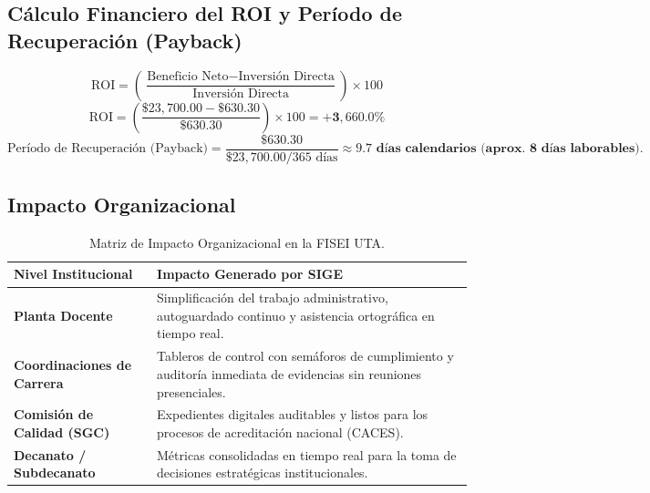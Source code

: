 \documentclass[12pt,a4paper]{article}
\begin{document}
\subsection{Cálculo Financiero del ROI y Período de Recuperación (Payback)}
\[
\text{ROI} = \left( \frac{\text{Beneficio Neto} - \text{Inversión Directa}}{\text{Inversión Directa}} \right) \times 100
\]
\[
\text{ROI} = \left( \frac{\$23,700.00 - \$630.30}{\$630.30} \right) \times 100 = \mathbf{+3,660.0\%}
\]
\[
\text{Período de Recuperación (Payback)} = \frac{\$630.30}{\$23,700.00 / 365\text{ días}} \approx \mathbf{9.7\text{ días calendarios (aprox. 8 días laborables)}}.
\]

\subsection{Impacto Organizacional}
\begin{table}[htbp]
\centering
\small
\begin{tabularx}{\textwidth}{|>{\hsize=0.7\hsize\bfseries}X|>{\hsize=1.3\hsize}X|}
    \hline
    \rowcolor{tableheader}
    Nivel Institucional & Impacto Generado por SIGE \\
    \hline
    Planta Docente & Simplificación del trabajo administrativo, autoguardado continuo y asistencia ortográfica en tiempo real. \\
    \hline
    Coordinaciones de Carrera & Tableros de control con semáforos de cumplimiento y auditoría inmediata de evidencias sin reuniones presenciales. \\
    \hline
    Comisión de Calidad (SGC) & Expedientes digitales auditables y listos para los procesos de acreditación nacional (CACES). \\
    \hline
    Decanato / Subdecanato & Métricas consolidadas en tiempo real para la toma de decisiones estratégicas institucionales. \\
    \hline
\end{tabularx}
\caption{Matriz de Impacto Organizacional en la FISEI UTA.}
\label{tab:s1_06_impacto}
\end{table}
\end{document}
